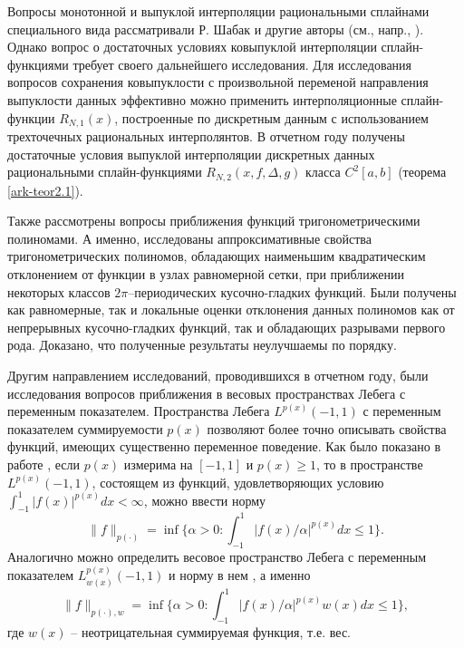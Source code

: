 Вопросы монотонной и выпуклой интерполяции рациональными сплайнами
специального вида рассматривали Р. Шабак \cite{ark-8} и другие авторы (см., напр.,
\cite{ark-9, ark-10, ark-11}).
%
Однако вопрос о достаточных условиях ковыпуклой интерполяции сплайн-функциями
требует своего дальнейшего исследования. Для исследования вопросов сохранения ковыпуклости
с произвольной переменой направления выпуклости данных эффективно можно применить
интерполяционные сплайн-функции $R_{N,1}(x)$, построенные по дискретным данным с
использованием трехточечных рациональных интерполянтов. В отчетном году получены достаточные условия выпуклой интерполяции дискретных данных рациональными
сплайн-функциями $R_{N,2}(x, f, \Delta, g)$ класса $C^2[a,b]$ (теорема \ref{ark-teor2.1}).

Также рассмотрены вопросы приближения функций тригонометрическими полиномами. А именно, исследованы аппроксимативные свойства тригонометрических полиномов, обладающих наименьшим квадратическим отклонением от функции в узлах равномерной сетки, при приближении некоторых классов $2\pi$--периодических кусочно-гладких функций. Были получены как равномерные, так и локальные оценки отклонения данных полиномов как от непрерывных кусочно-гладких функций,
так и обладающих разрывами первого рода. Доказано, что полученные результаты неулучшаемы по порядку.

Другим направлением исследований, проводившихся в отчетном году, были исследования вопросов приближения в весовых пространствах Лебега с переменным показателем. Пространства Лебега $L^{p(x)}(-1,1)$ с переменным показателем суммируемости $p(x)$ позволяют более точно описывать свойства функций, имеющих существенно переменное поведение. Как было показано в работе \cite{rffi-20}, если $p(x)$ измерима на $[-1,1]$ и $p(x)\geq1$, то в пространстве $L^{p(x)}(-1,1)$, состоящем из функций, удовлетворяющих условию $\int_{-1}^1|f(x)|^{p(x)}dx <\infty$, можно ввести норму
$$
\|f\|_{p(\cdot)}=\inf\{\alpha>0:\int_{-1}^1|f(x)/\alpha|^{p(x)}dx\le1\}.
$$
Аналогично можно определить весовое пространство Лебега с переменным показателем \linebreak $L^{p(x)}_{w(x)}(-1,1)$ и норму в нем \cite{rffi-26, rffi-27, rffi-28, rffi-29, rffi-30, rffi-31}, а именно
$$
\|f\|_{p(\cdot),w}=\inf\{\alpha>0:\int_{-1}^1|f(x)/\alpha|^{p(x)}w(x)dx\le1\},
$$
где $w(x)$ -- неотрицательная суммируемая функция, т.е. вес.

